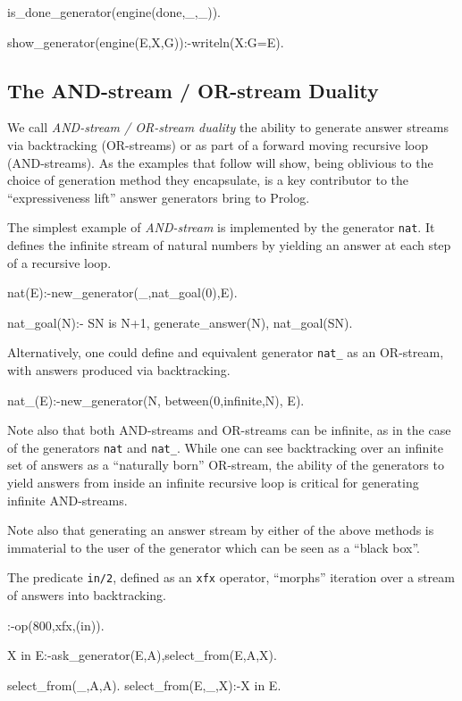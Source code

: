 \documentclass{new_tlp}
\begin{document}
\begin{code}
is_done_generator(engine(done,_,_)).
\end{code}

\begin{codeh}
show_generator(engine(E,X,G)):-writeln(X:G=E).
\end{codeh}

\subsection{The AND-stream / OR-stream Duality}

We call {\em AND-stream / OR-stream duality} the
ability to generate answer streams via backtracking (OR-streams) or
as part of a forward moving recursive loop (AND-streams).
As the examples that follow will show,
being oblivious to the choice of generation method they encapsulate,
is a key contributor to the ``expressiveness lift'' answer generators
bring to Prolog.

The simplest example of {\em AND-stream} is  implemented
by the generator {\tt nat}. It defines the infinite stream of natural numbers 
by yielding an answer at each step of a recursive loop.
\begin{code}
nat(E):-new_generator(_,nat_goal(0),E).

nat_goal(N):-
  SN is N+1,
  generate_answer(N),
  nat_goal(SN).
\end{code}

Alternatively, one could define 
and equivalent generator {\tt nat\_} as an OR-stream,  with answers 
produced via  backtracking.

\begin{code}
nat_(E):-new_generator(N, between(0,infinite,N), E).
\end{code}

Note also that both AND-streams and OR-streams can be infinite, as in the
case of the generators {\tt nat} and {\tt nat\_}.
While one can see backtracking over an infinite set of answers as
a ``naturally born'' OR-stream, the ability of the generators to
yield answers from inside an infinite recursive loop is critical
for generating infinite AND-streams.

Note also that generating an answer stream by either of the above methods
is immaterial to the user of the generator which can be seen as a ``black box''.

The predicate {\tt in/2}, defined as an {\tt xfx} operator,
``morphs'' iteration over  a stream of answers into backtracking.
\begin{code}
:-op(800,xfx,(in)).

X in E:-ask_generator(E,A),select_from(E,A,X).

select_from(_,A,A).
select_from(E,_,X):-X in E.
\end{code}
\end{document}
